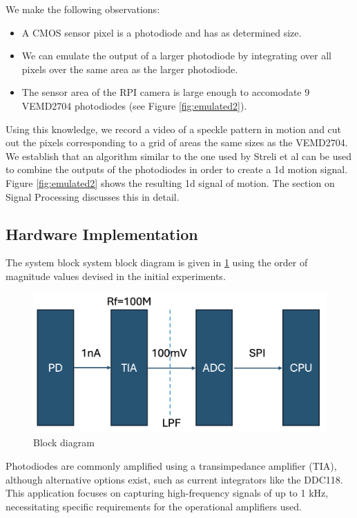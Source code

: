 We make the following observations:
\begin{itemize}
  
  \item A CMOS sensor pixel is a photodiode and has as determined size.
  \item We can emulate the output of a larger photodiode by integrating over all pixels over the same area as the larger photodiode.
  \item The sensor area of the RPI camera is large enough to accomodate 9 VEMD2704 photodiodes (see Figure \ref{fig:emulated2}).
\end{itemize}

Using this knowledge, we record a video of a speckle pattern in motion and cut out the pixels corresponding to a grid of areas the same sizes as the VEMD2704. 
We establish that an algorithm similar to the one used by Streli et al \cite{structured-light-speckle} can be used to combine the outputs of the photodiodes in order to create a 1d motion signal.
Figure \ref{fig:emulated2} shows the resulting 1d signal of motion. The section on Signal Processing discusses this in detail.

\subsection{Hardware Implementation}

The system block system block diagram is given in \ref{fig:block} using the order of magnitude values devised in the initial experiments.
\begin{figure}[t]
  \centering
  \includegraphics[width=\widthnarrow]{figures/impl/block_diagram.png}
  \caption{Block diagram}
  \label{fig:block}
\end{figure}

Photodiodes are commonly amplified using a transimpedance amplifier (TIA), although alternative options exist, such as current integrators like the DDC118. 
This application focuses on capturing high-frequency signals of up to 1 kHz, necessitating specific requirements for the operational amplifiers used.

